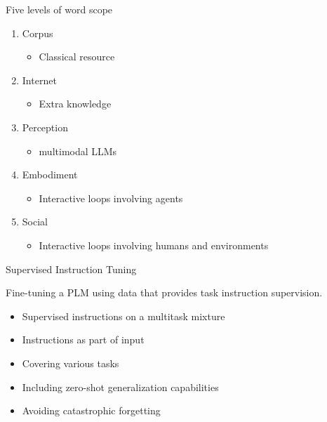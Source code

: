 
\begin{vbframe}{Five levels of word scope}

\vfill

\begin{enumerate}

    \item Corpus
        \begin{itemize}
        \item Classical resource
        \end{itemize}

    \item Internet 
        \begin{itemize}
        \item Extra knowledge
        \end{itemize}

    \item Perception 
        \begin{itemize}
        \item multimodal LLMs
        \end{itemize}

    \item Embodiment 
        \begin{itemize}
        \item Interactive loops involving agents
        \end{itemize}

    \item Social 
        \begin{itemize}
        \item Interactive loops involving humans and environments
        \end{itemize}

\end{enumerate}

\vfill

\end{vbframe}


\begin{vbframe}{Supervised Instruction Tuning}

\vfill

Fine-tuning a PLM using data that provides task instruction supervision. \vskip3mm
\begin{itemize}
\item Supervised instructions on a multitask mixture
\item Instructions as part of input
\item Covering various tasks 
\item Including zero-shot generalization capabilities
\item Avoiding catastrophic forgetting
\end{itemize}

\vfill

\end{vbframe}

